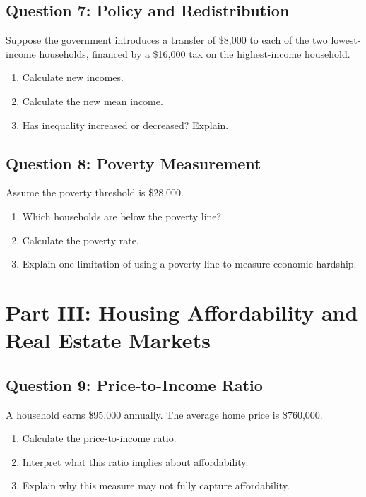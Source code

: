 \documentclass[11pt]{article}
\begin{document}
\subsection*{Question 7: Policy and Redistribution}

Suppose the government introduces a transfer of \$8,000 to each of the two lowest-income households, financed by a \$16,000 tax on the highest-income household.

\begin{enumerate}
\item Calculate new incomes.
\item Calculate the new mean income.
\item Has inequality increased or decreased? Explain.
\end{enumerate}


\subsection*{Question 8: Poverty Measurement}

Assume the poverty threshold is \$28,000.

\begin{enumerate}
\item Which households are below the poverty line?
\item Calculate the poverty rate.
\item Explain one limitation of using a poverty line to measure economic hardship.
\end{enumerate}
\newpage
\section*{Part III: Housing Affordability and Real Estate Markets}

\subsection*{Question 9: Price-to-Income Ratio}

A household earns \$95,000 annually. The average home price is \$760,000.

\begin{enumerate}
\item Calculate the price-to-income ratio.
\item Interpret what this ratio implies about affordability.
\item Explain why this measure may not fully capture affordability.
\end{enumerate}
\end{document}
